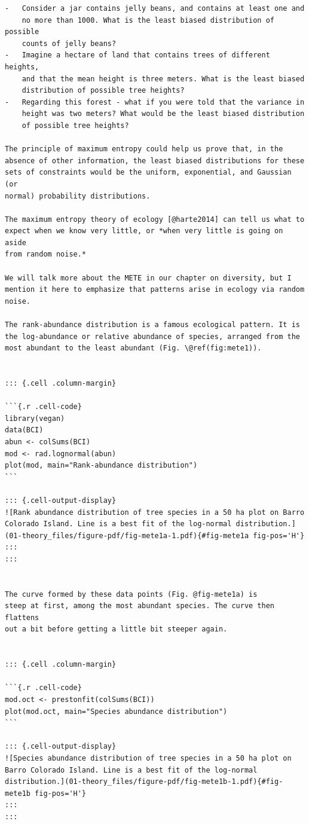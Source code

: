 \documentclass[
  10pt,
  letterpaper,
  nols]{tufte-book}
\begin{document}
\begin{verbatim}
-   Consider a jar contains jelly beans, and contains at least one and
    no more than 1000. What is the least biased distribution of possible
    counts of jelly beans?
-   Imagine a hectare of land that contains trees of different heights,
    and that the mean height is three meters. What is the least biased
    distribution of possible tree heights?
-   Regarding this forest - what if you were told that the variance in
    height was two meters? What would be the least biased distribution
    of possible tree heights?

The principle of maximum entropy could help us prove that, in the
absence of other information, the least biased distributions for these
sets of constraints would be the uniform, exponential, and Gaussian (or
normal) probability distributions.

The maximum entropy theory of ecology [@harte2014] can tell us what to
expect when we know very little, or *when very little is going on aside
from random noise.*

We will talk more about the METE in our chapter on diversity, but I
mention it here to emphasize that patterns arise in ecology via random
noise.

The rank-abundance distribution is a famous ecological pattern. It is
the log-abundance or relative abundance of species, arranged from the
most abundant to the least abundant (Fig. \@ref(fig:mete1)).


::: {.cell .column-margin}

```{.r .cell-code}
library(vegan)
data(BCI)
abun <- colSums(BCI)
mod <- rad.lognormal(abun)
plot(mod, main="Rank-abundance distribution")
```

::: {.cell-output-display}
![Rank abundance distribution of tree species in a 50 ha plot on Barro Colorado Island. Line is a best fit of the log-normal distribution.](01-theory_files/figure-pdf/fig-mete1a-1.pdf){#fig-mete1a fig-pos='H'}
:::
:::


The curve formed by these data points (Fig. @fig-mete1a) is
steep at first, among the most abundant species. The curve then flattens
out a bit before getting a little bit steeper again. 


::: {.cell .column-margin}

```{.r .cell-code}
mod.oct <- prestonfit(colSums(BCI))
plot(mod.oct, main="Species abundance distribution")  
```

::: {.cell-output-display}
![Species abundance distribution of tree species in a 50 ha plot on Barro Colorado Island. Line is a best fit of the log-normal distribution.](01-theory_files/figure-pdf/fig-mete1b-1.pdf){#fig-mete1b fig-pos='H'}
:::
:::



\end{verbatim}
\end{document}
